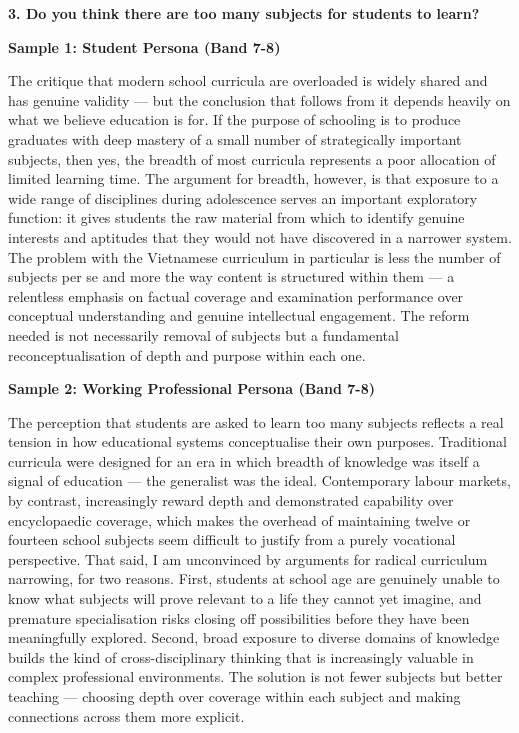 \separator

\begin{ieltsquestion}
\textbf{3. Do you think there are too many subjects for students to learn?}
\end{ieltsquestion}
\textbf{Sample 1: Student Persona (Band 7-8)}

The critique that modern school curricula are overloaded is widely shared and has genuine validity — but the conclusion that follows from it depends heavily on what we believe education is for. If the purpose of schooling is to produce graduates with deep mastery of a small number of strategically important subjects, then yes, the breadth of most curricula represents a poor allocation of limited learning time. The argument for breadth, however, is that exposure to a wide range of disciplines during adolescence serves an important exploratory function: it gives students the raw material from which to identify genuine interests and aptitudes that they would not have discovered in a narrower system. The problem with the Vietnamese curriculum in particular is less the number of subjects per se and more the way content is structured within them — a relentless emphasis on factual coverage and examination performance over conceptual understanding and genuine intellectual engagement. The reform needed is not necessarily removal of subjects but a fundamental reconceptualisation of depth and purpose within each one.

\textbf{Sample 2: Working Professional Persona (Band 7-8)}

The perception that students are asked to learn too many subjects reflects a real tension in how educational systems conceptualise their own purposes. Traditional curricula were designed for an era in which breadth of knowledge was itself a signal of education — the generalist was the ideal. Contemporary labour markets, by contrast, increasingly reward depth and demonstrated capability over encyclopaedic coverage, which makes the overhead of maintaining twelve or fourteen school subjects seem difficult to justify from a purely vocational perspective. That said, I am unconvinced by arguments for radical curriculum narrowing, for two reasons. First, students at school age are genuinely unable to know what subjects will prove relevant to a life they cannot yet imagine, and premature specialisation risks closing off possibilities before they have been meaningfully explored. Second, broad exposure to diverse domains of knowledge builds the kind of cross-disciplinary thinking that is increasingly valuable in complex professional environments. The solution is not fewer subjects but better teaching — choosing depth over coverage within each subject and making connections across them more explicit.

